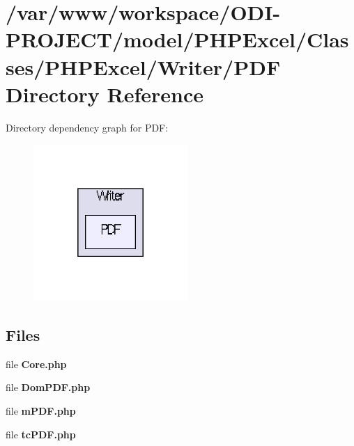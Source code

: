 \section{/var/www/workspace/\+O\+D\+I-\/\+P\+R\+O\+J\+E\+C\+T/model/\+P\+H\+P\+Excel/\+Classes/\+P\+H\+P\+Excel/\+Writer/\+P\+D\+F Directory Reference}
\label{dir_e78750f0bbd2d02e56dbca2e335029d2}
Directory dependency graph for P\+D\+F\+:\nopagebreak
\begin{figure}[H]
\begin{center}
\leavevmode
\includegraphics[width=166pt]{dir_e78750f0bbd2d02e56dbca2e335029d2_dep}
\end{center}
\end{figure}
\subsection*{Files}
\begin{DoxyCompactItemize}
\item 
file {\bfseries Core.\+php}
\item 
file {\bfseries Dom\+P\+D\+F.\+php}
\item 
file {\bfseries m\+P\+D\+F.\+php}
\item 
file {\bfseries tc\+P\+D\+F.\+php}
\end{DoxyCompactItemize}
